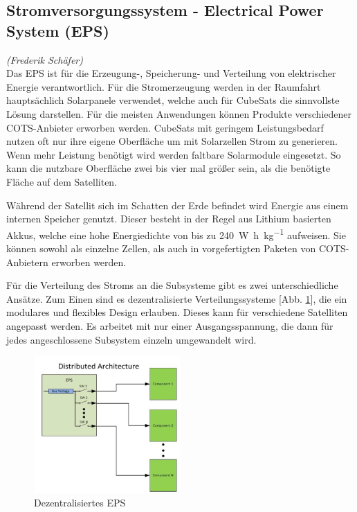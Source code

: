 		\subsection[Stromversorgungssystem]{Stromversorgungssystem - Electrical Power System (EPS)}%
\hfill\emph{(Frederik Schäfer)}\\
Das EPS ist für die Erzeugung-, Speicherung- und Verteilung von elektrischer Energie verantwortlich. 
Für die Stromerzeugung werden in der Raumfahrt hauptsächlich Solarpanele verwendet, welche auch für CubeSats die sinnvollste Lösung darstellen.
Für die meisten Anwendungen können Produkte verschiedener COTS-Anbieter erworben werden. CubeSats mit geringem Leistungsbedarf nutzen oft nur ihre eigene Oberfläche um mit Solarzellen Strom zu generieren. Wenn mehr Leistung benötigt wird werden faltbare Solarmodule eingesetzt. So kann die nutzbare Oberfläche zwei bis vier mal größer sein, als die benötigte Fläche auf dem Satelliten.\cite{Lettau.}

	Während der Satellit sich im Schatten der Erde befindet wird Energie aus einem internen Speicher genutzt. Dieser besteht in der Regel aus Lithium basierten Akkus, welche eine hohe Energiedichte von bis zu \SI[per-mode=symbol]{240}{\watt\hour\per\kilogram} aufweisen. Sie können sowohl als einzelne Zellen, als auch in vorgefertigten Paketen von COTS-Anbietern erworben werden.\cite{Lettau., Abaker.2017}
	


	Für die Verteilung des Stroms an die Subsysteme gibt es zwei unterschiedliche Ansätze. Zum Einen sind es dezentralisierte Verteilungssysteme [Abb. \ref{d_eps}], die ein modulares und flexibles Design erlauben. Dieses kann für verschiedene Satelliten angepasst werden. Es arbeitet mit nur einer Ausgangsspannung, die dann für jedes angeschlossene Subsystem einzeln umgewandelt wird.%
\begin{figure}[t]
	\centering
		\includegraphics[width=0.50\textwidth]{./graphics/Distributed_EPS.PNG}
	\caption{Dezentralisiertes EPS \cite{Burt.2011}}
	\label{d_eps}
\end{figure}

